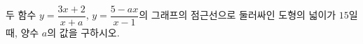 두 함수 $y=\dfrac{3x+2}{x+a}$, $y=\dfrac{5-ax}{x-1}$의 그래프의 점근선으로 둘러싸인 도형의 넓이가 $15$일 때, 양수 $a$의 값을 구하시오.
